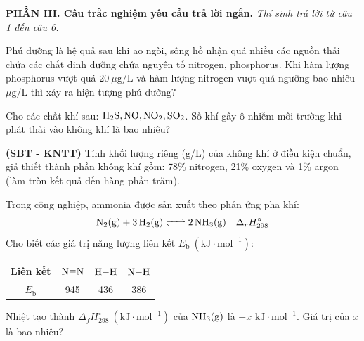 \documentclass[12pt,a4paper]{article}
\begin{document}
\vspace{0.3cm}
\noindent\textbf{\large PHẦN III. Câu trắc nghiệm yêu cầu trả lời ngắn.}
\textit{Thí sinh trả lời từ câu 1 đến câu 6.}
\vspace{0.2cm}

\begin{ex}
Phú dưỡng là hệ quả sau khi ao ngòi, sông hồ nhận quá nhiều các nguồn thải chứa các chất dinh dưỡng chứa nguyên tố nitrogen, phosphorus. Khi hàm lượng phosphorus vượt quá $20\ \mu\text{g/L}$ và hàm lượng nitrogen vượt quá ngưỡng bao nhiêu $\mu\text{g/L}$ thì xảy ra hiện tượng phú dưỡng?

\vspace{1.0cm}

\end{ex}

\begin{ex}
Cho các chất khí sau: $\ce{H2S, NO, NO2, SO2}$. Số khí gây ô nhiễm môi trường khi phát thải vào không khí là bao nhiêu?

\vspace{1.0cm}

\end{ex}

\begin{ex}
\textbf{(SBT - KNTT)} Tính khối lượng riêng (g/L) của không khí ở điều kiện chuẩn, giả thiết thành phần không khí gồm: 78\% nitrogen, 21\% oxygen và 1\% argon (làm tròn kết quả đến hàng phần trăm).

\vspace{1.5cm}

\end{ex}

\begin{ex}
Trong công nghiệp, ammonia được sản xuất theo phản ứng pha khí:
\[\ce{N2(g) + 3H2(g) <=> 2NH3(g)} \quad \Delta_r H^\circ_{298}\]
Cho biết các giá trị năng lượng liên kết $E_\text{b}\ (\text{kJ}\cdot\text{mol}^{-1})$:
\begin{center}
\begin{tabular}{|c|c|c|c|}
\hline
\textbf{Liên kết} & $\ce{N\bond{3}N}$ & $\ce{H-H}$ & $\ce{N-H}$ \\ \hline
$E_\text{b}$ & 945 & 436 & 386 \\ \hline
\end{tabular}
\end{center}
Nhiệt tạo thành $\Delta_f H^\circ_{298}\ (\text{kJ}\cdot\text{mol}^{-1})$ của $\ce{NH3(g)}$ là $-x\text{ kJ}\cdot\text{mol}^{-1}$. Giá trị của $x$ là bao nhiêu?

\vspace{1.5cm}

\end{ex}
\end{document}
